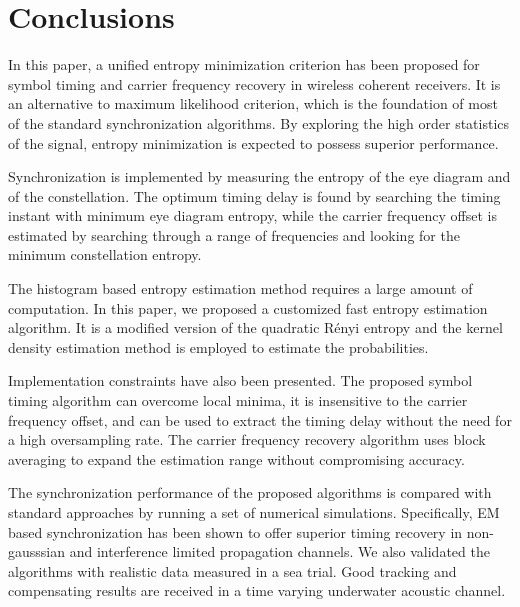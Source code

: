 \documentclass[journal,comsoc, onecolumn, 12pt,draftclsnofoot]{IEEEtran} %
\begin{document}
\section{Conclusions}
\label{sec:conc}
In this paper, a unified entropy minimization criterion has been proposed for symbol timing and carrier frequency recovery in wireless coherent receivers.
It is an alternative to maximum likelihood criterion, which is the foundation of most of the standard synchronization algorithms. 
By exploring the high order statistics of the signal, entropy minimization is expected to possess superior performance. 

Synchronization is implemented by measuring the entropy of the eye diagram and of the constellation.
% 
% 
The optimum timing delay is found by searching the timing instant with minimum eye diagram entropy, while the carrier frequency offset is estimated by searching through a range of frequencies and looking for the minimum constellation entropy.  

The histogram based entropy estimation method requires a large amount of computation.
In this paper, we proposed a customized fast entropy estimation algorithm.
It is a modified version of the quadratic R\'enyi entropy and the kernel density estimation method is employed to estimate the probabilities.

Implementation constraints have also been presented. 
The proposed symbol timing algorithm can overcome local minima, it is  insensitive to the carrier frequency offset, and can be used to extract the timing delay without the need for a high oversampling rate.
The carrier frequency recovery algorithm uses block averaging to expand the estimation range without compromising accuracy. 

The synchronization performance of the proposed algorithms is compared with standard approaches by running a set of numerical simulations.
Specifically, EM based synchronization has been shown to offer superior timing recovery in non-gausssian and interference limited propagation channels.
% 
% 
We also validated the algorithms with realistic data measured in a sea trial.
Good tracking and compensating results are received in a time varying underwater acoustic channel.


\end{document}
